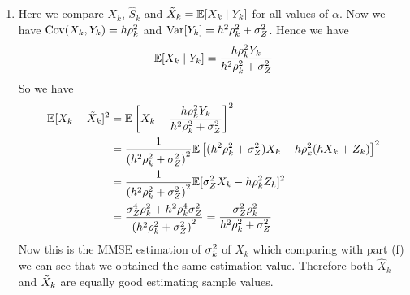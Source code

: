 \documentclass[a4paper, 11pt]{article}
\begin{document}
{\begin{enumerate}[label=(\alph*)]
\item Here we compare $X_k$, $\hat{S}_k$ and $\tilde{X}_k=\mathbb{E}[X_k\mid Y_k]$ for all values of $\alpha$. Now we have $\operatorname{Cov}(X_k,Y_k)=h\rho_k^2$ and $\operatorname{Var}[Y_k]=h^2\rho_k^2+\sigma_Z^2$. Hence we have $$\mathbb{E}[X_k\mid Y_k]=\frac{h\rho_k^2 Y_k}{h^2\rho_k^2+\sigma_Z^2}$$So we have\begin{align*}
	\mathbb{E}[X_k-\tilde{X}_k]^2 & = \mathbb{E}\left[X_k-\frac{h\rho_k^2 Y_k}{h^2\rho_k^2+\sigma_Z^2}\right] ^2\\
	& = \frac{1}{\left(h^2\rho_k^2+\sigma_Z^2\right)^2}\mathbb{E}\left[(h^2\rho_k^2+\sigma_Z^2)X_k-h\rho_k^2(hX_k+Z_k)\right]^2\\
	& = \frac{1}{\left(h^2\rho_k^2+\sigma_Z^2\right)^2}\mathbb{E}[\sigma_Z^2X_k-h\rho_k^2Z_k]^2\\
	& = \frac{\sigma_Z^4\rho_k^2+h^2\rho_k^4\sigma_Z^2}{\left(h^2\rho_k^2+\sigma_Z^2\right)^2}= \frac{\sigma_Z^2\rho_k^2}{h^2\rho_k^2+\sigma_Z^2}
\end{align*}Now this is the MMSE estimation of $\sigma_k^2$ of $X_k$ which comparing with part (f) we can see that we obtained the same estimation value. Therefore both $\hat{X}_k$ and $\tilde{X}_k$ are equally good estimating sample values. 


\end{enumerate}}
\end{document}
